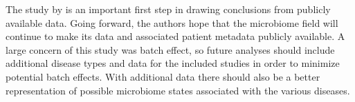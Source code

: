 The study by \citet{Duvallet2017} is an important first step in drawing conclusions from publicly available data. Going forward, the authors hope that the microbiome field will continue to make its data and associated patient metadata publicly available. A large concern of this study was batch effect, so future analyses should include additional disease types and data for the included studies in order to minimize potential batch effects. With additional data there should also be a better representation of possible microbiome states associated with the various diseases. 